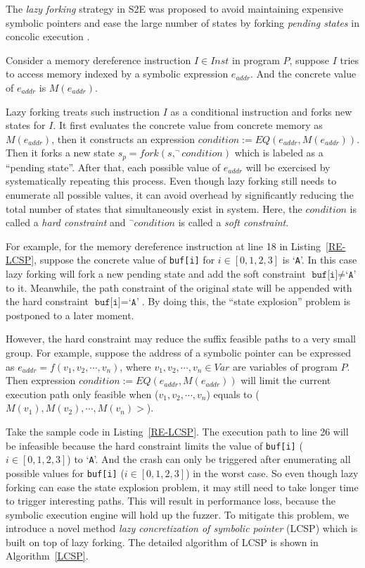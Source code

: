 The \textit{lazy forking} strategy in S2E was proposed to avoid maintaining expensive symbolic pointers and ease the large number of states by forking \textit{pending states} in concolic execution \cite{chipounov2011s2e}. 

Consider a memory dereference instruction $I\in Inst$ in program $P$, suppose $I$ tries to access memory indexed by a symbolic expression $e_{addr}$. And the concrete value of $e_{addr}$ is $M(e_{addr})$.

Lazy forking treats such instruction $I$ as a conditional instruction and forks new states for $I$. It first evaluates the concrete value from concrete memory as $M(e_{addr})$, then it constructs an expression $condition:= EQ(e_{addr}, M(e_{addr}))$. Then it forks a new state $s_p=fork(s, ^\neg condition)$ which is labeled as a ``pending state''. After that, each possible value of $e_{addr}$ will be exercised by systematically repeating this process. Even though lazy forking still needs to enumerate all possible values, it can avoid overhead by significantly reducing the total number of states that simultaneously exist in system. Here, the $condition$ is called a \textit{hard constraint} and $^\neg condition$ is called a \textit{soft constraint}.

For example, for the memory dereference instruction at line 18 in Listing~\ref{RE-LCSP}, suppose the concrete value of \texttt{buf[i]} for $i\in[0,1,2,3]$ is `\texttt{A}'. 
In this case lazy forking will fork a new pending state and add the soft constraint $\texttt{buf[i]}\neq\texttt{`A'}$ to it. Meanwhile, the path constraint of the original state will be appended with the hard constraint $\texttt{buf[i]}=\texttt{`A'}$.
By doing this, the ``state explosion'' problem is postponed to a later moment.

However, the hard constraint may reduce the suffix feasible paths to a very small group. For example, suppose the address of a symbolic pointer can be expressed as $e_{addr}=f(v_1, v_2,\cdots, v_n)$, where $v_1, v_2,\cdots, v_n\in Var$ are variables of program $P$.
 Then expression $condition:= EQ(e_{addr}, M(e_{addr}))$ will limit the current execution path only feasible when ($v_1, v_2,\cdots, v_n$) equals to ($M(v_1), M(v_2),\cdots, M(v_n)>$). 

Take the sample code in Listing~\ref{RE-LCSP}. The execution path to line 26 will be infeasible because the hard constraint limits the value of \texttt{buf[i]} ($i\in[0,1,2,3]$) to `\texttt{A}'. And the crash can only be triggered after enumerating all possible values for \texttt{buf[i]} ($i\in[0,1,2,3]$) in the worst case.
So even though lazy forking can ease the state explosion problem, it may still need to take longer time to trigger interesting paths. This will result in performance loss, because the symbolic execution engine will hold up the fuzzer. 
To mitigate this problem, we introduce a novel method \emph{lazy concretization of symbolic pointer} (LCSP) which is built on top of lazy forking. The detailed algorithm of LCSP is shown in Algorithm~\ref{LCSP}.


